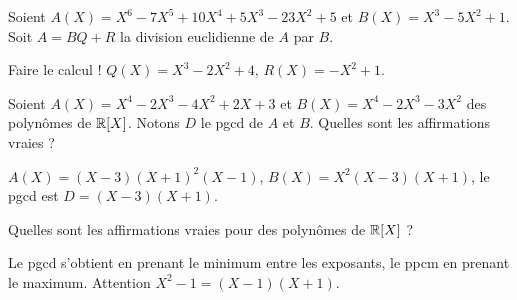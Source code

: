 \begin{question}

Soient $A(X) = X^6 - 7 X^5 + 10 X^4 + 5 X^3 - 23 X^2 + 5$ et $B(X) = X^3-5X^2+1$. Soit $A = BQ+R$ la division euclidienne de $A$ par $B$.
\begin{answers}



\end{answers}
\begin{explanations}
Faire le calcul !
$Q(X) = X^3-2X^2+4$, $R(X) = -X^2+1$.
\end{explanations}
\end{question}

\begin{question}

Soient $A(X) = X^4 - 2 X^3 - 4 X^2 + 2 X + 3$ et 
$B(X) = X^4 - 2 X^3 - 3 X^2$ des polynômes de $\mathbb{R}[X]$.
Notons $D$ le pgcd de $A$ et $B$.
Quelles sont les affirmations vraies  ?
\begin{answers}



\end{answers}
\begin{explanations}
$A(X) = (X-3)(X+1)^2(X-1)$, $B(X) = X^2(X-3)(X+1)$,
le pgcd est $D = (X-3)(X+1)$. 
\end{explanations}
\end{question}


\begin{question}

Quelles sont les affirmations vraies pour des polynômes de $\mathbb{R}[X]$ ?
\begin{answers}
    

    
\end{answers}
\begin{explanations}
Le pgcd s'obtient en prenant le minimum entre les exposants, le ppcm en prenant le maximum. Attention $X^2-1=(X-1)(X+1)$.
\end{explanations}
\end{question}




